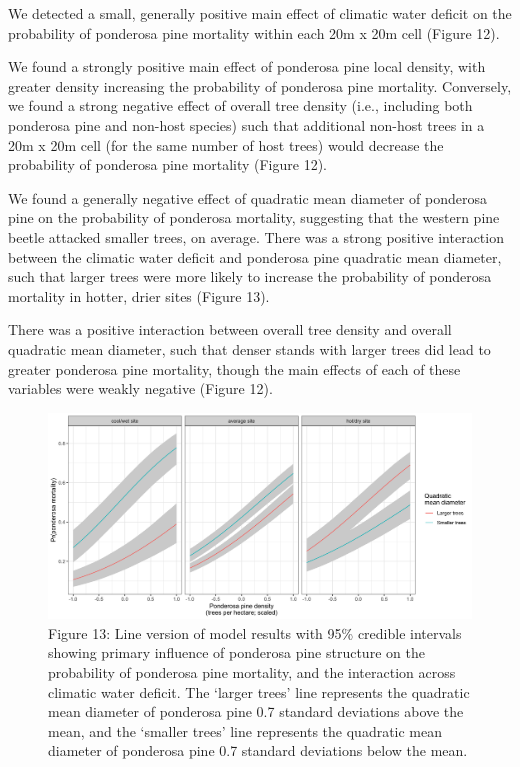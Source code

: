 \documentclass[]{article}
\begin{document}
We detected a small, generally positive main effect of climatic water
deficit on the probability of ponderosa pine mortality within each 20m x
20m cell (Figure 12).

We found a strongly positive main effect of ponderosa pine local
density, with greater density increasing the probability of ponderosa
pine mortality. Conversely, we found a strong negative effect of overall
tree density (i.e., including both ponderosa pine and non-host species)
such that additional non-host trees in a 20m x 20m cell (for the same
number of host trees) would decrease the probability of ponderosa pine
mortality (Figure 12).

We found a generally negative effect of quadratic mean diameter of
ponderosa pine on the probability of ponderosa mortality, suggesting
that the western pine beetle attacked smaller trees, on average. There
was a strong positive interaction between the climatic water deficit and
ponderosa pine quadratic mean diameter, such that larger trees were more
likely to increase the probability of ponderosa mortality in hotter,
drier sites (Figure 13).

There was a positive interaction between overall tree density and
overall quadratic mean diameter, such that denser stands with larger
trees did lead to greater ponderosa pine mortality, though the main
effects of each of these variables were weakly negative (Figure 12).

\begin{figure}
\centering
\includegraphics{../../figures/pipo_tpha_qmd_cwd_interaction.png}
\caption{Figure 13: Line version of model results with 95\% credible
intervals showing primary influence of ponderosa pine structure on the
probability of ponderosa pine mortality, and the interaction across
climatic water deficit. The `larger trees' line represents the quadratic
mean diameter of ponderosa pine 0.7 standard deviations above the mean,
and the `smaller trees' line represents the quadratic mean diameter of
ponderosa pine 0.7 standard deviations below the mean.}
\end{figure}
\end{document}
